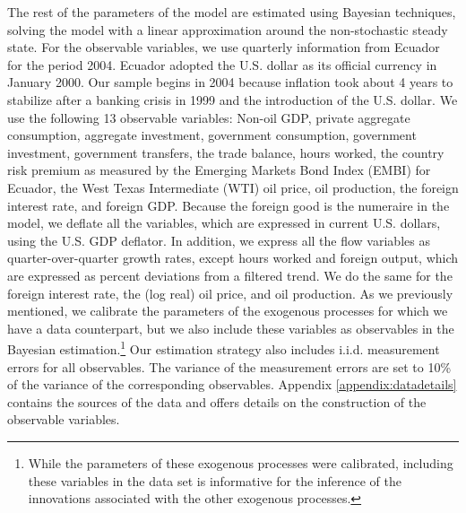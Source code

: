 \documentclass[12pt]{article}
\begin{document}
The rest of the parameters of the model are estimated using Bayesian techniques, solving the model with a linear approximation around the non-stochastic steady state. For the observable variables, we use quarterly information from Ecuador for the period 2004. Ecuador adopted the U.S. dollar as its official currency in January 2000. Our sample begins in 2004 because inflation took about 4 years to stabilize after a banking crisis in 1999 and the introduction of the U.S. dollar. We use the following 13 observable variables: Non-oil GDP, private aggregate consumption, aggregate investment, government consumption, government investment, government transfers, the trade balance, hours worked, the country risk premium as measured by the Emerging Markets Bond Index (EMBI) for Ecuador, the West Texas Intermediate (WTI) oil price, oil production, the foreign interest rate, and foreign GDP. Because the foreign good is the numeraire in the model, we deflate all the variables, which are expressed in current U.S. dollars, using the U.S. GDP deflator. In addition, we express all the flow variables as quarter-over-quarter growth rates, except hours worked and foreign output, which are expressed as percent deviations from a \citet{hodrick1997filter} filtered trend. We do the same for the foreign interest rate, the (log real) oil price, and oil production. As we previously mentioned, we calibrate the parameters of the exogenous processes for which we have a data counterpart, but we also include these variables as observables in the Bayesian estimation.\footnote{While the parameters of these exogenous processes were calibrated, including these variables in the data set is informative for the inference of the innovations associated with the other exogenous processes.} Our estimation strategy also includes i.i.d. measurement errors for all observables. The variance of the measurement errors are set to 10\% of the variance of the corresponding observables. Appendix \ref{appendix:datadetails} contains the sources of the data and offers details on the construction of the observable variables.
\end{document}
